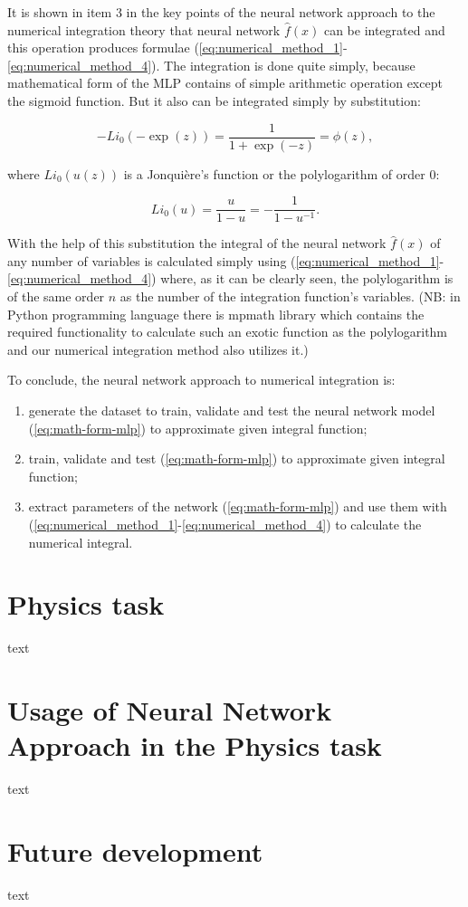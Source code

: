 \documentclass[%
]{ittmm}
\begin{document}
It is shown in item 3 in the key points of the neural network approach to the numerical integration theory that neural network $\hat{f}(x)$ can be integrated and this operation produces formulae (\ref{eq:numerical_method_1}-\ref{eq:numerical_method_4}). The integration is done quite simply, because mathematical form of the MLP contains of simple arithmetic operation except the sigmoid function. But it also can be integrated simply by substitution:

\begin{equation}
    \label{eq:substitution-li-sigm}
    -Li_0(-\exp(z)) = \frac{1}{1+\exp(-z)} = \phi(z),
\end{equation}

\noindent where $Li_0(u(z))$ is a Jonquière's function or the polylogarithm of order 0:

\begin{equation}
    \label{eq:li0-def}
    Li_0(u) = \frac{u}{1 - u} = -\frac{1}{1 - u^{-1}}.
\end{equation}

With the help of this substitution the integral of the neural network $\hat{f}(x)$ of any number of variables is calculated simply using (\ref{eq:numerical_method_1}-\ref{eq:numerical_method_4}) where, as it can be clearly seen, the polylogarithm is of the same order $n$ as the number of the integration function's variables. (NB: in Python programming language there is mpmath library which contains the required functionality to calculate such an exotic function as the polylogarithm and our numerical integration method also utilizes it.)

To conclude, the neural network approach to numerical integration is:

\begin{enumerate}
    \item generate the dataset to train, validate and test the neural network model (\ref{eq:math-form-mlp}) to approximate given integral function;
    \item train, validate and test (\ref{eq:math-form-mlp}) to approximate given integral function;
    \item extract parameters of the network (\ref{eq:math-form-mlp}) and use them with (\ref{eq:numerical_method_1}-\ref{eq:numerical_method_4}) to calculate the numerical integral.
\end{enumerate}

\section{Physics task}

text

\section{Usage of Neural Network Approach in the Physics task}

text

\section{Future development}

text



\end{document}
